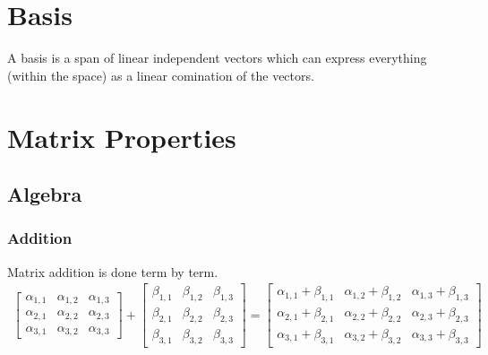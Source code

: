 \documentclass[12pt]{article}
\begin{document}
\section{Basis}
A basis is a span of linear independent vectors which can express everything (within the space) as a linear comination of the vectors.
\section{Matrix Properties}
\subsection{Algebra}
\subsubsection{Addition}
Matrix addition is done term by term.
\begin{align}
	\left[\begin{array}{ccc}
		\alpha_{1,1} & \alpha_{1,2} & \alpha_{1,3}\\
		\alpha_{2,1} & \alpha_{2,2} & \alpha_{2,3}\\
		\alpha_{3,1} & \alpha_{3,2} & \alpha_{3,3}
	\end{array}\right]+\left[\begin{array}{ccc}
		\beta_{1,1} & \beta_{1,2} & \beta_{1,3}\\
		\beta_{2,1} & \beta_{2,2} & \beta_{2,3}\\
		\beta_{3,1} & \beta_{3,2} & \beta_{3,3}
	\end{array}\right]=\left[\begin{array}{ccc}
		\alpha_{1,1} + \beta_{1,1} & \alpha_{1,2} + \beta_{1,2} & \alpha_{1,3} + \beta_{1,3}\\
		\alpha_{2,1} + \beta_{2,1} & \alpha_{2,2} + \beta_{2,2} & \alpha_{2,3} + \beta_{2,3}\\
		\alpha_{3,1} + \beta_{3,1} & \alpha_{3,2} + \beta_{3,2} & \alpha_{3,3} + \beta_{3,3}
	\end{array}\right]
\end{align}
\end{document}
